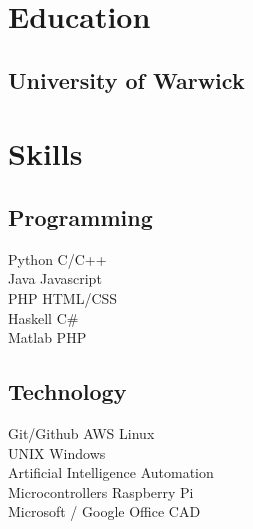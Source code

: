 \documentclass{deedy-resume-reversed}
\begin{document}
\begin{minipage}[t]{0.60\textwidth}

% 
% 

%
%

\end{minipage}
\hfill
\begin{minipage}[t]{0.33\textwidth}


\section{Education}

\subsection{University of Warwick}
\sectionsep


\section{Skills}
\subsection{Programming}
Python \textbullet{} C/C++ \\ Java \textbullet{} Javascript\\
PHP \textbullet{} HTML/CSS \\ Haskell \textbullet{} C\# \\
Matlab \textbullet{} PHP \\
\sectionsep

\subsection{Technology}
Git/Github \textbullet{} AWS \textbullet{} Linux \\
UNIX \textbullet{} Windows \\
Artificial Intelligence \textbullet{} Automation \\
Microcontrollers \textbullet{} Raspberry Pi \\
Microsoft / Google Office \textbullet{} CAD
\sectionsep


\end{minipage}
\end{document}
